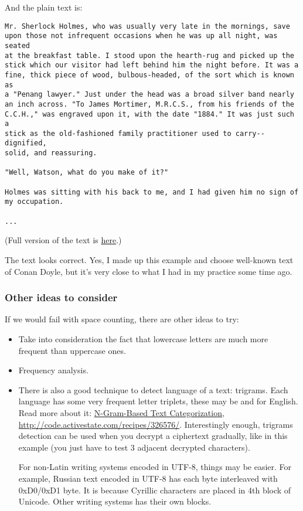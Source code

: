 And the plain text is:

\begin{lstlisting}
Mr. Sherlock Holmes, who was usually very late in the mornings, save
upon those not infrequent occasions when he was up all night, was seated
at the breakfast table. I stood upon the hearth-rug and picked up the
stick which our visitor had left behind him the night before. It was a
fine, thick piece of wood, bulbous-headed, of the sort which is known as
a "Penang lawyer." Just under the head was a broad silver band nearly
an inch across. "To James Mortimer, M.R.C.S., from his friends of the
C.C.H.," was engraved upon it, with the date "1884." It was just such a
stick as the old-fashioned family practitioner used to carry--dignified,
solid, and reassuring.

"Well, Watson, what do you make of it?"

Holmes was sitting with his back to me, and I had given him no sign of
my occupation.

...
\end{lstlisting}

(Full version of the text is \href{https://github.com/dennis714/yurichev.com/blob/master/blog/XOR_mask_2/files/plain.txt}{here}.)

The text looks correct.
Yes, I made up this example and choose well-known text of Conan Doyle, but it's very close to what I had in my practice some time ago.

\subsubsection{Other ideas to consider}

If we would fail with space counting, there are other ideas to try:

\begin{itemize}

\item Take into consideration the fact that lowercase letters are much more frequent than uppercase ones.

\item Frequency analysis.

\item There is also a good technique to detect language of a text: trigrams.
Each language has some very frequent letter triplets, these may be  and  for English.
Read more about it:
\href{http://odur.let.rug.nl/~vannoord/TextCat/textcat.pdf}{N-Gram-Based Text Categorization},
\url{http://code.activestate.com/recipes/326576/}.
Interestingly enough, trigrams detection can be used when you decrypt a ciphertext gradually, like in this example (you just have to test 3 adjacent decrypted characters).

For non-Latin writing systems encoded in UTF-8, things may be easier. For example, Russian text encoded in UTF-8 has each byte interleaved with 0xD0/0xD1 byte.
It is because Cyrillic characters are placed in 4th block of Unicode.
Other writing systems has their own blocks.

\end{itemize}
